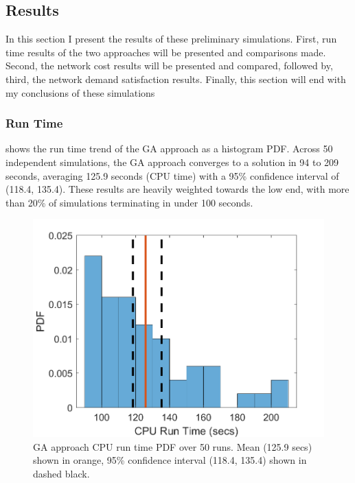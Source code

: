 \documentclass[12pt,dvipsnames]{report}
\begin{document}
\subsection{Results} \label{subsec:prelim_results}

In this section I present the results of these preliminary simulations.  First, run time results of the two approaches will be presented and comparisons made.  Second, the network cost results will be presented and compared, followed by, third, the network demand satisfaction results.  Finally, this section will end with my conclusions of these simulations

\subsubsection{Run Time}

 shows the run time trend of the GA approach as a histogram PDF.  Across 50 independent simulations, the GA approach converges to a solution in 94 to 209 seconds, averaging 125.9 seconds (CPU time) with a 95\% confidence interval of (118.4, 135.4).  These results are heavily weighted towards the low end, with more than 20\% of simulations terminating in under 100 seconds.

\begin{figure}[htp]
	\centering
	\includegraphics[height=0.4\textheight]{Figures/Prelim_GARuntime50}
	\caption[Preliminary simulations GA CPU run time PDF]{GA approach CPU run time PDF over 50 runs.  Mean (125.9 secs) shown in orange, 95\% confidence interval (118.4, 135.4) shown in dashed black.}
	\label{fig:Prelim_GARunTime}
\end{figure}
\end{document}
